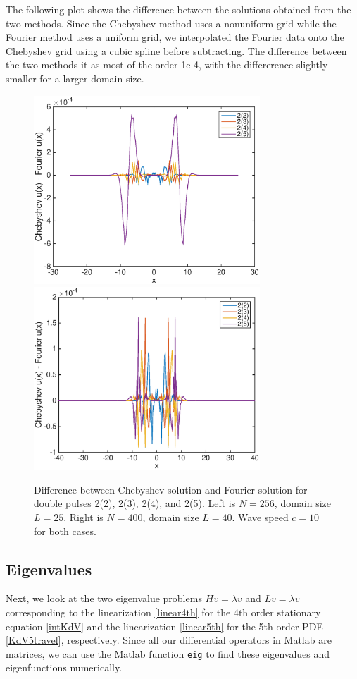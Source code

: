 \documentclass[12pt]{article}
\begin{document}
The following plot shows the difference between the solutions obtained from the two methods. Since the Chebyshev method uses a nonuniform grid while the Fourier method uses a uniform grid, we interpolated the Fourier data onto the Chebyshev grid using a cubic spline before subtracting. The difference between the two methods it as most of the order 1e-4, with the differerence slightly smaller for a larger domain size.

\begin{figure}[H]
	\includegraphics[width=8.5cm]{chebfourdiff.eps}
	\includegraphics[width=8.5cm]{chebfourdiff40.eps}
	\caption{Difference between Chebyshev solution and Fourier solution for double pulses 2(2), 2(3), 2(4), and 2(5). Left is $N = 256$, domain size $L = 25$. Right is $N = 400$, domain size $L = 40$. Wave speed $c = 10$ for both cases.}
\end{figure}

\subsection{Eigenvalues}

Next, we look at the two eigenvalue problems $Hv = \lambda v$ and $Lv = \lambda v$ corresponding to the linearization \eqref{linear4th} for the 4th order stationary equation \eqref{intKdV} and the linearization \eqref{linear5th} for the 5th order PDE \eqref{KdV5travel}, respectively. Since all our differential operators in Matlab are matrices, we can use the Matlab function \texttt{eig} to find these eigenvalues and eigenfunctions numerically. \\
\end{document}
